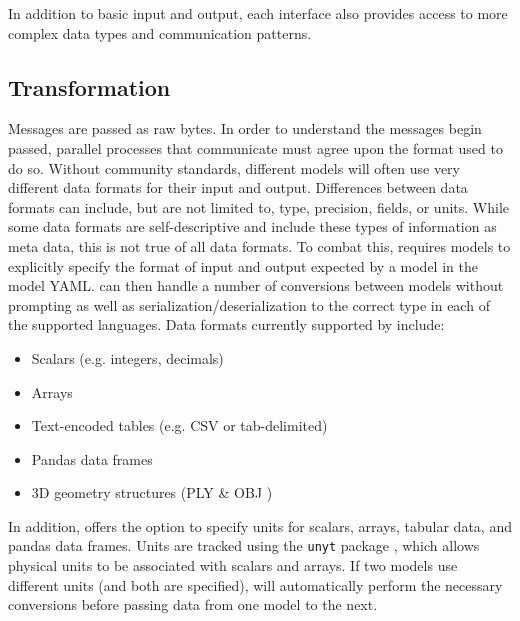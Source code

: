 \documentclass[journal]{IEEEtran}
\newcommand{\todo}[1]{{\color{red}{#1}}}
\newcommand{\pkg}{{\tt \todo{cis\_interface}}{}}
\begin{document}
In addition to basic input and output, each interface also provides access 
to more complex data types and communication patterns.


%
\subsection{Transformation}\label{SS:transformation}
%
%
Messages are passed as raw bytes. In order to understand the messages begin passed, parallel processes that communicate must agree upon the format used to do so. Without community standards, different models will often use very different data formats for their input and output. Differences between data formats can include, but are not limited to, type, precision, fields, or units. While some data formats are self-descriptive and include these types of information as meta data, this is not true of all data formats. To combat this, {\pkg} requires models to explicitly specify the format of input and output expected by a model in the model YAML. {\pkg} can then handle a number of conversions between models without prompting as well as serialization/deserialization to the correct type in each of the supported languages. Data formats currently supported by {\pkg} include:
%
\begin{itemize}
	\item Scalars (e.g. integers, decimals)
	\item Arrays
	\item Text-encoded tables (e.g. CSV or tab-delimited)
	\item Pandas data frames \citep{pandas}
	\item 3D geometry structures (PLY \citep{ply} \& OBJ \citep{obj})
\end{itemize}

%
In addition, {\pkg} offers the option to specify units for scalars, arrays, tabular data, and pandas data frames. Units are tracked using the {\tt unyt} package \citep{Goldbaum2018}, which allows physical units to be associated with scalars and arrays. If two models use different units (and both are specified), {\pkg} will automatically perform the necessary conversions before passing data from one model to the next.
\end{document}
